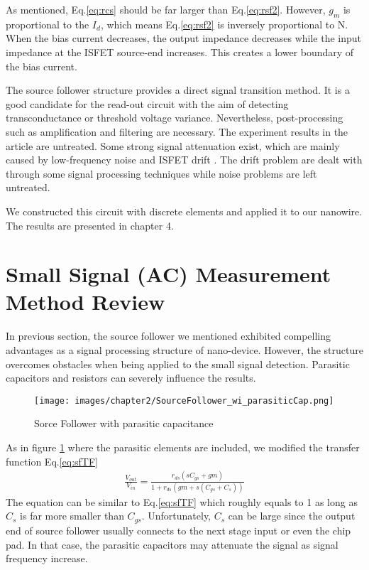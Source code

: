 As mentioned, Eq.\ref{eq:rcs} should be far larger than Eq.\ref{eq:rsf2}.
However, $g_m$ is proportional to the $I_d$, which means Eq.\ref{eq:rsf2} is inversely proportional to N.
When the bias current decreases, the output impedance decreases while the input impedance at the ISFET source-end increases.
This creates a lower boundary of the bias current.

The source follower structure provides a direct signal transition method.
It is a good candidate for the read-out circuit with the aim of detecting transconductance or threshold voltage variance.
Nevertheless, post-processing such as amplification and filtering are necessary.
The experiment results in the article are untreated.
Some strong signal attenuation exist, which are mainly caused by low-frequency noise and ISFET drift \cite{Drift}.
The drift problem are dealt with through some signal processing techniques while noise problems are left untreated.

We constructed this circuit with discrete elements and applied it to our nanowire. The results are presented in chapter 4.


\section{Small Signal (AC) Measurement Method Review}
In previous section, the source follower we mentioned exhibited compelling advantages as a signal processing structure of nano-device.
However, the structure overcomes obstacles when being applied to the small signal detection.
Parasitic capacitors and resistors can severely influence the results.

\begin{figure}[h]
    \centering
    \texttt{[image: images/chapter2/SourceFollower\_wi\_parasiticCap.png]}
    \fontsize{6}{7}\selectfont
    \caption{Sorce Follower with parasitic capacitance}
    \label{fig:SF_pC}
\end{figure}

As in figure \ref{fig:SF_pC} where the parasitic elements are included, we modified the transfer function Eq.\ref{eq:sfTF}
\begin{align}
    \frac{V_{out}}{V_{in}} = \frac{r_{ds}(sC_{gs} + gm)}{1 + r_{ds}(gm + s(C_{gs}+C_s))}
\end{align}
The equation can be similar to Eq.\ref{eq:sfTF} which roughly equals to 1 as long as $C_s$ is far more smaller than $C_{gs}$.
Unfortunately, $C_s$ can be large since the output end of source follower usually connects to the next stage input or even the chip pad.
In that case, the parasitic capacitors may attenuate the signal as signal frequency increase.

